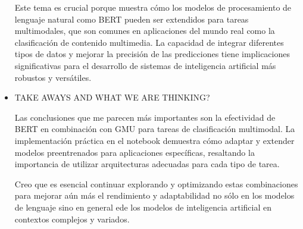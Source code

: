 \documentclass[letter, 11pt, twoside]{report}
\begin{document}
\begin{itemize}
    Este tema es crucial porque muestra cómo los modelos de procesamiento de lenguaje natural como BERT pueden ser extendidos para tareas multimodales, que son comunes en aplicaciones del mundo real como la clasificación de contenido multimedia. La capacidad de integrar diferentes tipos de datos y mejorar la precisión de las predicciones tiene implicaciones significativas para el desarrollo de sistemas de inteligencia artificial más robustos y versátiles.

    \item TAKE AWAYS AND WHAT WE ARE THINKING?
    
    Las conclusiones que me parecen más importantes son la efectividad de BERT en combinación con GMU para tareas de clasificación multimodal. La implementación práctica en el notebook demuestra cómo adaptar y extender modelos preentrenados para aplicaciones específicas, resaltando la importancia de utilizar arquitecturas adecuadas para cada tipo de tarea. 
    
    Creo que es esencial continuar explorando y optimizando estas combinaciones para mejorar aún más el rendimiento y adaptabilidad no sólo en los modelos de lenguaje sino en general ede los modelos de inteligencia artificial  en contextos complejos y variados.
\end{itemize}
\end{document}
